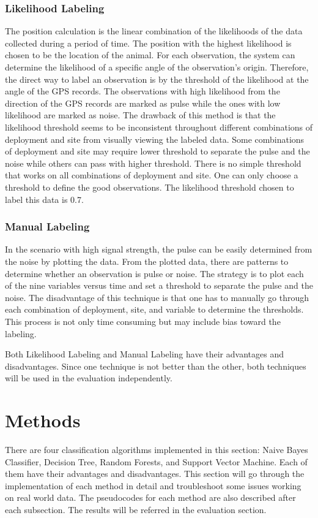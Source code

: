 \documentclass[twoside]{article}
\begin{document}
\subsubsection{Likelihood Labeling}
The position calculation is the linear combination of the likelihoods of the data collected during a period of time. The position with the highest likelihood is chosen to be the location of the animal. For each observation, the system can determine the likelihood of a specific angle of the observation's origin. Therefore, the direct way to label an observation is by the threshold of the likelihood at the angle of the GPS records. The observations with high likelihood from the direction of the GPS records are marked as pulse while the ones with low likelihood are marked as noise. The drawback of this method is that the likelihood threshold seems to be inconsistent throughout different combinations of deployment and site from visually viewing the labeled data. Some combinations of deployment and site may require lower threshold to separate the pulse and the noise while others can pass with higher threshold. There is no simple threshold that works on all combinations of deployment and site. One can only choose a threshold to define the good observations. The likelihood threshold chosen to label this data is 0.7.

\subsubsection{Manual Labeling}
In the scenario with high signal strength, the pulse can be easily determined from the noise by plotting the data. From the plotted data, there are patterns to determine whether an observation is pulse or noise. The strategy is to plot each of the nine variables versus time and set a threshold to separate the pulse and the noise. The disadvantage of this technique is that one has to manually go through each combination of deployment, site, and variable to determine the thresholds. This process is not only time consuming but may include bias toward the labeling. 

\hfill \break
\noindent
Both Likelihood Labeling and Manual Labeling have their advantages and disadvantages. Since one technique is not better than the other, both techniques will be used in the evaluation independently.



\section{Methods}
There are four classification algorithms implemented in this section: Naive Bayes Classifier, Decision Tree, Random Forests, and Support Vector Machine. Each of them have their advantages and disadvantages. This section will go through the implementation of each method in detail and troubleshoot some issues working on real world data. The pseudocodes for each method are also described after each subsection. The results will be referred in the evaluation section.
\end{document}
